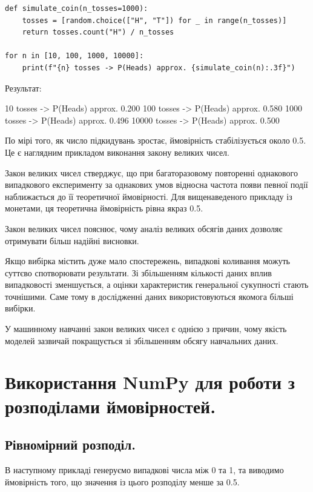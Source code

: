\begin{lstlisting}
def simulate_coin(n_tosses=1000):
    tosses = [random.choice(["H", "T"]) for _ in range(n_tosses)]
    return tosses.count("H") / n_tosses

for n in [10, 100, 1000, 10000]:
    print(f"{n} tosses -> P(Heads) approx. {simulate_coin(n):.3f}")
\end{lstlisting}

Результат:

\begin{console}
10 tosses -> P(Heads) approx. 0.200
100 tosses -> P(Heads) approx. 0.580
1000 tosses -> P(Heads) approx. 0.496
10000 tosses -> P(Heads) approx. 0.500
\end{console}

По мірі того, як число підкидувань зростає, ймовірність стабілізується около 0.5. Це є наглядним прикладом виконання закону великих чисел.

Закон великих чисел стверджує, що при багаторазовому повторенні однакового випадкового експерименту за однакових умов відносна частота появи певної події наближається до її теоретичної ймовірності. Для вищенаведеного прикладу із монетами, ця теоретична ймовірність рівна якраз 0.5.

Закон великих чисел пояснює, чому аналіз великих обсягів даних дозволяє отримувати більш надійні висновки.

Якщо вибірка містить дуже мало спостережень, випадкові коливання можуть суттєво спотворювати результати. Зі збільшенням кількості даних вплив випадковості зменшується, а оцінки характеристик генеральної сукупності стають точнішими. Саме тому в дослідженні даних використовуються якомога більші вибірки.

У машинному навчанні закон великих чисел є однією з причин, чому якість моделей зазвичай покращується зі збільшенням обсягу навчальних даних.


\section{Використання NumPy для роботи з розподілами ймовірностей.}

\subsection{Рівномірний розподіл.}

В наступному прикладі генеруємо випадкові числа між 0 та 1, та виводимо ймовірність того, що значення із цього розподілу менше за 0.5.

